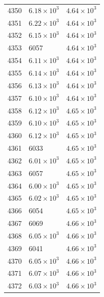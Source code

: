 \begin{table}[H]
\begin{tabular}{lll}
4350 & $\displaystyle 6.18 \times 10^{3}$ & $\displaystyle 4.64 \times 10^{3}$ \\
4351 & $\displaystyle 6.22 \times 10^{3}$ & $\displaystyle 4.64 \times 10^{3}$ \\
4352 & $\displaystyle 6.15 \times 10^{3}$ & $\displaystyle 4.64 \times 10^{3}$ \\
4353 & 6057 & $\displaystyle 4.64 \times 10^{3}$ \\
4354 & $\displaystyle 6.11 \times 10^{3}$ & $\displaystyle 4.64 \times 10^{3}$ \\
4355 & $\displaystyle 6.14 \times 10^{3}$ & $\displaystyle 4.64 \times 10^{3}$ \\
4356 & $\displaystyle 6.13 \times 10^{3}$ & $\displaystyle 4.64 \times 10^{3}$ \\
4357 & $\displaystyle 6.10 \times 10^{3}$ & $\displaystyle 4.64 \times 10^{3}$ \\
4358 & $\displaystyle 6.12 \times 10^{3}$ & $\displaystyle 4.65 \times 10^{3}$ \\
4359 & $\displaystyle 6.10 \times 10^{3}$ & $\displaystyle 4.65 \times 10^{3}$ \\
4360 & $\displaystyle 6.12 \times 10^{3}$ & $\displaystyle 4.65 \times 10^{3}$ \\
4361 & 6033 & $\displaystyle 4.65 \times 10^{3}$ \\
4362 & $\displaystyle 6.01 \times 10^{3}$ & $\displaystyle 4.65 \times 10^{3}$ \\
4363 & 6057 & $\displaystyle 4.65 \times 10^{3}$ \\
4364 & $\displaystyle 6.00 \times 10^{3}$ & $\displaystyle 4.65 \times 10^{3}$ \\
4365 & $\displaystyle 6.02 \times 10^{3}$ & $\displaystyle 4.65 \times 10^{3}$ \\
4366 & 6054 & $\displaystyle 4.65 \times 10^{3}$ \\
4367 & 6069 & $\displaystyle 4.66 \times 10^{3}$ \\
4368 & $\displaystyle 6.05 \times 10^{3}$ & $\displaystyle 4.66 \times 10^{3}$ \\
4369 & 6041 & $\displaystyle 4.66 \times 10^{3}$ \\
4370 & $\displaystyle 6.05 \times 10^{3}$ & $\displaystyle 4.66 \times 10^{3}$ \\
4371 & $\displaystyle 6.07 \times 10^{3}$ & $\displaystyle 4.66 \times 10^{3}$ \\
4372 & $\displaystyle 6.03 \times 10^{3}$ & $\displaystyle 4.66 \times 10^{3}$ \\

\end{tabular}
\end{table}
